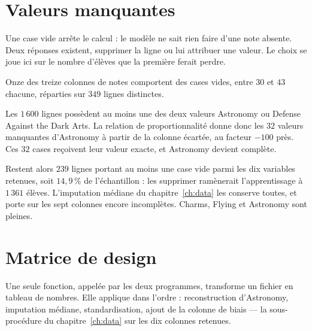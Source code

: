 \section{Valeurs manquantes}

\begin{lecture}
Une case vide arrête le calcul : le modèle ne sait rien faire d'une note absente.
Deux réponses existent, supprimer la ligne ou lui attribuer une valeur. Le choix
se joue ici sur le nombre d'élèves que la première ferait perdre.
\end{lecture}

Onze des treize colonnes de notes comportent des cases vides, entre $30$ et $43$
chacune, réparties sur $349$ lignes distinctes.

Les $1\,600$ lignes possèdent au moins une des deux valeurs Astronomy ou Defense
Against the Dark Arts. La relation de proportionnalité donne donc les $32$
valeurs manquantes d'Astronomy à partir de la colonne écartée, au facteur $-100$
près. Ces $32$ cases reçoivent leur valeur exacte, et Astronomy devient complète.

Restent alors $239$ lignes portant au moins une case vide parmi les dix variables
retenues, soit $14{,}9\,\%$ de l'échantillon : les supprimer ramènerait
l'apprentissage à $1\,361$ élèves. L'imputation médiane du
chapitre~\ref{ch:data} les conserve toutes, et porte sur les sept colonnes encore
incomplètes. Charms, Flying et Astronomy sont pleines.

\section{Matrice de design}

Une seule fonction, appelée par les deux programmes, transforme un fichier en
tableau de nombres. Elle applique dans l'ordre : reconstruction d'Astronomy,
imputation médiane, standardisation, ajout de la colonne de biais --- la
sous-procédure du chapitre~\ref{ch:data} sur les dix colonnes retenues.

